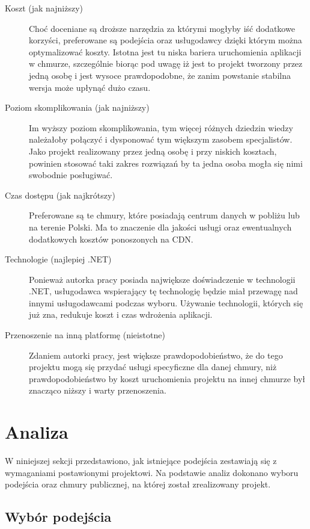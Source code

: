 \documentclass[12pt,a4paper,twoside,titlepage,openright]{book}
\begin{document}
\begin{description}
\item [Koszt (jak najniższy)] Choć doceniane są droższe narzędzia za którymi mogłyby iść dodatkowe korzyści, preferowane są podejścia oraz usługodawcy dzięki którym można optymalizować koszty. Istotna jest tu niska bariera uruchomienia aplikacji w chmurze, szczególnie biorąc pod uwagę iż jest to projekt tworzony przez jedną osobę i jest wysoce prawdopodobne, że zanim powstanie stabilna wersja może upłynąć dużo czasu.
\item [Poziom skomplikowania (jak najniższy)] Im wyższy poziom skomplikowania, tym więcej różnych dziedzin wiedzy należałoby połączyć i dysponować tym większym zasobem specjalistów. Jako projekt realizowany przez jedną osobę i przy niskich kosztach, powinien stosować taki zakres rozwiązań by ta jedna osoba mogła się nimi swobodnie posługiwać.
\item [Czas dostępu (jak najkrótszy)] Preferowane są te chmury, które posiadają centrum danych w pobliżu lub na terenie Polski. Ma to znaczenie dla jakości usługi oraz ewentualnych dodatkowych kosztów ponoszonych na CDN.
\item [Technologie (najlepiej .NET)] Ponieważ autorka pracy posiada największe doświadczenie w technologii .NET, usługodawca wspierający tę technologię będzie miał przewagę nad innymi usługodawcami podczas wyboru. Używanie technologii, których się już zna, redukuje koszt i czas wdrożenia aplikacji.
\item [Przenoszenie na inną platformę (nieistotne)] Zdaniem autorki pracy, jest większe prawdopodobieństwo, że do tego projektu mogą się przydać usługi specyficzne dla danej chmury, niż prawdopodobieństwo by koszt uruchomienia projektu na innej chmurze był znacząco niższy i warty przenoszenia. 
\end{description}

\section{Analiza}

W niniejszej sekcji przedstawiono, jak istniejące podejścia zestawiają się z wymaganiami postawionymi projektowi. Na podstawie analiz dokonano wyboru podejścia oraz chmury publicznej, na której został zrealizowany projekt.

\subsection{Wybór podejścia}
\end{document}

